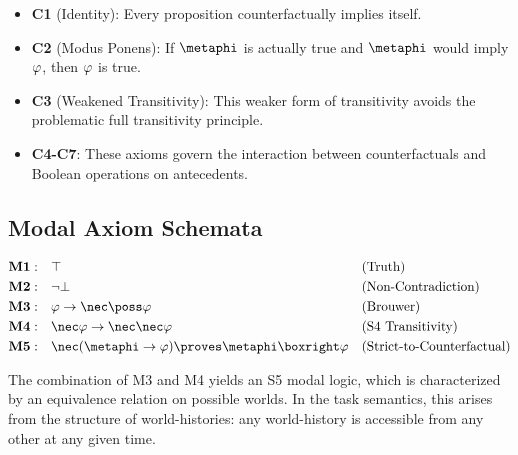 \documentclass[../LogosReference.tex]{subfiles}
\begin{document}
\begin{remark}
	\begin{itemize}
		\item \textbf{C1} (Identity): Every proposition counterfactually implies itself.
		\item \textbf{C2} (Modus Ponens): If $\metaphi$ is actually true and $\metaphi$ would imply $\varphi$, then $\varphi$ is true.
		\item \textbf{C3} (Weakened Transitivity): This weaker form of transitivity avoids the problematic full transitivity principle.
		\item \textbf{C4-C7}: These axioms govern the interaction between counterfactuals and Boolean operations on antecedents.
	\end{itemize}
\end{remark}


\subsection{Modal Axiom Schemata}\label{sec:modal-axioms}

\begin{definition}\label{def:modal-axioms}
	\begin{align}
		\textbf{M1}: \quad & \top                                                        &  & \text{(Truth)}                    \\
		\textbf{M2}: \quad & \neg\bot                                                    &  & \text{(Non-Contradiction)}        \\
		\textbf{M3}: \quad & \metaA \to \nec\poss\metaA                                  &  & \text{(Brouwer)}                  \\
		\textbf{M4}: \quad & \nec\metaA \to \nec\nec\metaA                               &  & \text{(S4 Transitivity)}          \\
		\textbf{M5}: \quad & \nec(\metaphi \to \metaA) \proves \metaphi \boxright \metaA &  & \text{(Strict-to-Counterfactual)}
	\end{align}
\end{definition}

\begin{remark}
	The combination of M3 and M4 yields an S5 modal logic, which is characterized by an equivalence relation on possible worlds.
	In the task semantics, this arises from the structure of world-histories: any world-history is accessible from any other at any given time.
\end{remark}
\end{document}
